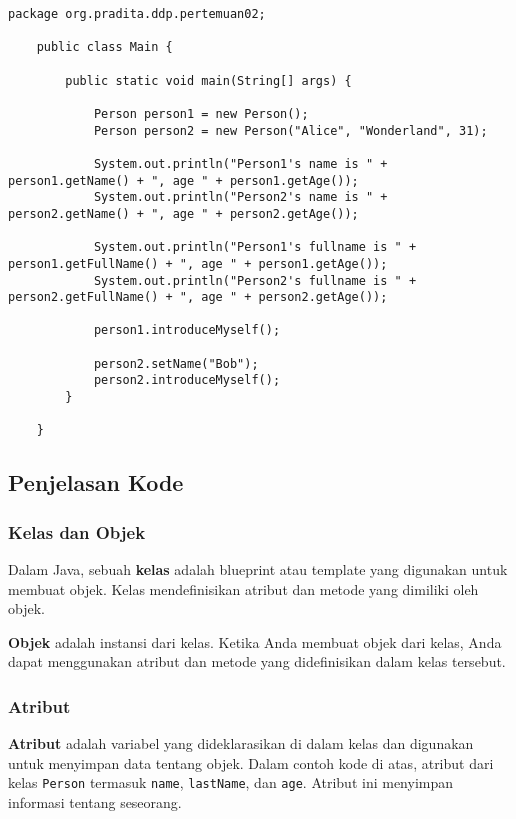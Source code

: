 \begin{lstlisting}[style=JavaStyle, caption={Kode Java: Main.java}]
	package org.pradita.ddp.pertemuan02;
	
	public class Main {
		
		public static void main(String[] args) {
			
			Person person1 = new Person();
			Person person2 = new Person("Alice", "Wonderland", 31);
			
			System.out.println("Person1's name is " + person1.getName() + ", age " + person1.getAge());
			System.out.println("Person2's name is " + person2.getName() + ", age " + person2.getAge());
			
			System.out.println("Person1's fullname is " + person1.getFullName() + ", age " + person1.getAge());
			System.out.println("Person2's fullname is " + person2.getFullName() + ", age " + person2.getAge());
			
			person1.introduceMyself();
			
			person2.setName("Bob");
			person2.introduceMyself();
		}
		
	}
\end{lstlisting}

\subsection{Penjelasan Kode}

\subsubsection{Kelas dan Objek}

Dalam Java, sebuah \textbf{kelas} adalah blueprint atau template yang digunakan untuk membuat objek. Kelas mendefinisikan atribut dan metode yang dimiliki oleh objek. 

\textbf{Objek} adalah instansi dari kelas. Ketika Anda membuat objek dari kelas, Anda dapat menggunakan atribut dan metode yang didefinisikan dalam kelas tersebut.

\subsubsection{Atribut}

\textbf{Atribut} adalah variabel yang dideklarasikan di dalam kelas dan digunakan untuk menyimpan data tentang objek. Dalam contoh kode di atas, atribut dari kelas \texttt{Person} termasuk \texttt{name}, \texttt{lastName}, dan \texttt{age}. Atribut ini menyimpan informasi tentang seseorang.

